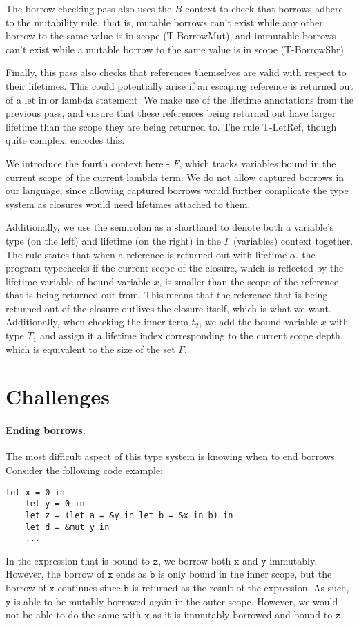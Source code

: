 \documentclass[letterpaper,11pt]{article}
\begin{document}
The borrow checking pass also uses the $B$ context to check that borrows adhere to
the mutability rule, that is, mutable borrows can't exist while any other borrow
to the same value is in scope (T-BorrowMut), and immutable borrows can't exist while a mutable
borrow to the same value is in scope (T-BorrowShr).

Finally, this pass also checks that references themselves are valid with respect
to their lifetimes. This could potentially arise if an escaping reference is returned
out of a let in or lambda statement. We make use of the lifetime annotations from
the previous pass, and ensure that these references being returned out have
larger lifetime than the scope they are being returned to. The rule T-LetRef,
though quite complex, encodes this.

We introduce the fourth context here - $F$, which tracks variables bound in the current
scope of the current lambda term. We do not allow captured borrows in our language, since allowing captured borrows 
would further complicate the type system as closures would need lifetimes attached to them.

Additionally, we use the semicolon as a shorthand to denote both a variable's type (on the left) and lifetime (on the right) in
the $\Gamma$ (variables) context together. The rule states that
when a reference is returned out with lifetime $\alpha$, the program typechecks
if the current scope of the closure, which is reflected by the lifetime variable
of bound variable $x$, is smaller than the scope of the reference that is being
returned out from. This means that the reference that is being returned out of
the closure outlives the closure itself, which is what we want. Additionally, when checking
the inner term $t_2$, we add the bound variable $x$ with type $T_1$ and assign it a lifetime index
corresponding to the current scope depth, which is equivalent to the size of the set $\Gamma$.

\section{Challenges}

\paragraph{Ending borrows.}
The most difficult aspect of this type system is knowing when to end borrows. Consider the following code example:
\begin{lstlisting}[language=caml]
    let x = 0 in 
    let y = 0 in 
    let z = (let a = &y in let b = &x in b) in 
    let d = &mut y in 
    ...
\end{lstlisting}
In the expression that is bound to $\mathtt{z}$, we borrow both $\mathtt{x}$ and $\mathtt{y}$ immutably.
However, the borrow of $\mathtt{x}$ ends as $\mathtt{b}$ is only bound in the inner scope, 
but the borrow of $\mathtt{x}$ continues since $\mathtt{b}$ is returned as the result of the expression.
As such, $\mathtt{y}$ is able to be mutably borrowed again in the outer scope. However, we would not be 
able to do the same with $\mathtt{x}$ as it is immutably borrowed and bound to $\mathtt{z}$.
\end{document}
